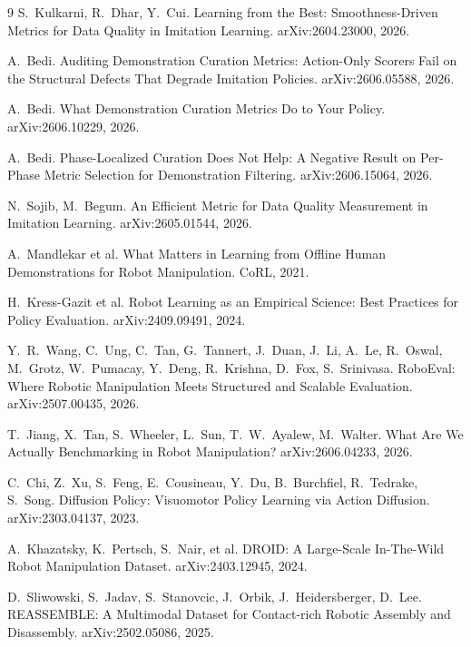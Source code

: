 \documentclass[10pt]{article}
\begin{document}

\begin{thebibliography}{9}
S.~Kulkarni, R.~Dhar, Y.~Cui.
\newblock Learning from the Best: Smoothness-Driven Metrics for Data Quality
in Imitation Learning.
\newblock arXiv:2604.23000, 2026.

A.~Bedi.
\newblock Auditing Demonstration Curation Metrics: Action-Only Scorers Fail
on the Structural Defects That Degrade Imitation Policies.
\newblock arXiv:2606.05588, 2026.

A.~Bedi.
\newblock What Demonstration Curation Metrics Do to Your Policy.
\newblock arXiv:2606.10229, 2026.

A.~Bedi.
\newblock Phase-Localized Curation Does Not Help: A Negative Result on
Per-Phase Metric Selection for Demonstration Filtering.
\newblock arXiv:2606.15064, 2026.

N.~Sojib, M.~Begum.
\newblock An Efficient Metric for Data Quality Measurement in Imitation
Learning.
\newblock arXiv:2605.01544, 2026.

A.~Mandlekar et al.
\newblock What Matters in Learning from Offline Human Demonstrations for
Robot Manipulation.
\newblock CoRL, 2021.

H.~Kress-Gazit et al.
\newblock Robot Learning as an Empirical Science: Best Practices for Policy
Evaluation.
\newblock arXiv:2409.09491, 2024.

Y.~R.~Wang, C.~Ung, C.~Tan, G.~Tannert, J.~Duan, J.~Li, A.~Le, R.~Oswal,
M.~Grotz, W.~Pumacay, Y.~Deng, R.~Krishna, D.~Fox, S.~Srinivasa.
\newblock RoboEval: Where Robotic Manipulation Meets Structured and Scalable
Evaluation.
\newblock arXiv:2507.00435, 2026.

T.~Jiang, X.~Tan, S.~Wheeler, L.~Sun, T.~W.~Ayalew, M.~Walter.
\newblock What Are We Actually Benchmarking in Robot Manipulation?
\newblock arXiv:2606.04233, 2026.

C.~Chi, Z.~Xu, S.~Feng, E.~Cousineau, Y.~Du, B.~Burchfiel, R.~Tedrake,
S.~Song.
\newblock Diffusion Policy: Visuomotor Policy Learning via Action Diffusion.
\newblock arXiv:2303.04137, 2023.

A.~Khazatsky, K.~Pertsch, S.~Nair, et al.
\newblock DROID: A Large-Scale In-The-Wild Robot Manipulation Dataset.
\newblock arXiv:2403.12945, 2024.

D.~Sliwowski, S.~Jadav, S.~Stanovcic, J.~Orbik, J.~Heidersberger, D.~Lee.
\newblock REASSEMBLE: A Multimodal Dataset for Contact-rich Robotic Assembly
and Disassembly.
\newblock arXiv:2502.05086, 2025.
\end{thebibliography}
\end{document}
